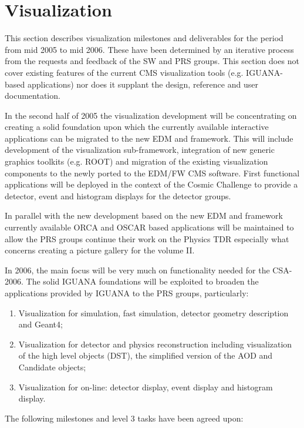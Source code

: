 \documentclass[draftmode]{memarticle}
\begin{document}
\section{Visualization}
\label{sec:visualization}

This section describes visualization milestones and
deliverables for the period from mid 2005 to mid 2006. These have been
determined by an iterative process from the requests and feedback of
the SW and PRS groups. This section does not cover existing features
of the current CMS visualization tools (e.g. IGUANA-based
applications) nor does it supplant the design, reference and user
documentation.

In the second half of 2005 the visualization development will be
concentrating on creating a solid foundation upon which
the currently available interactive applications
can be migrated to the new EDM and framework. This will include
development of the visualization sub-framework, integration of new
generic graphics toolkits (e.g. ROOT) and migration of the existing
visualization components to the newly ported to the EDM/FW CMS
software. First functional applications will be deployed in the
context of the Cosmic Challenge to provide a detector, event and
histogram displays for the detector groups.

In parallel with the new development based on the new EDM and
framework currently available ORCA and OSCAR based applications will
be maintained to allow the PRS groups continue their work on the
Physics TDR especially what concerns creating a picture gallery for
the volume II.

In 2006, the main focus will be very much on functionality needed for
the CSA-2006. The solid IGUANA foundations will be exploited to
broaden the applications provided by IGUANA to the PRS groups,
particularly:

\begin{enumerate}
  \item Visualization for simulation, fast simulation, detector
  geometry description and Geant4;
  \item Visualization for detector and physics reconstruction
  including visualization of the high level objects (DST), the
  simplified version of the AOD and Candidate objects;
  \item Visualization for on-line: detector display, event display and
  histogram display.
 \end{enumerate}

The following milestones
and level 3 tasks have been agreed upon:
\end{document}
